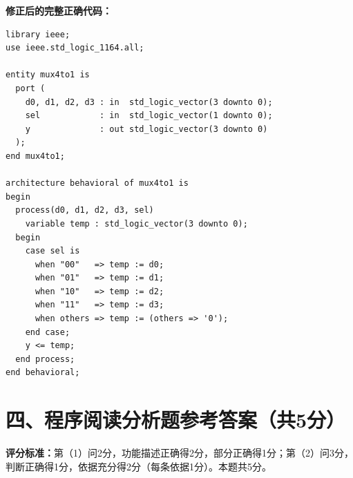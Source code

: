 \noindent\textbf{修正后的完整正确代码：}
\begin{lstlisting}[caption={修正后的4选1多路选择器}, label={lst:ans04_correct}]
library ieee;
use ieee.std_logic_1164.all;

entity mux4to1 is
  port (
    d0, d1, d2, d3 : in  std_logic_vector(3 downto 0);
    sel            : in  std_logic_vector(1 downto 0);
    y              : out std_logic_vector(3 downto 0)
  );
end mux4to1;

architecture behavioral of mux4to1 is
begin
  process(d0, d1, d2, d3, sel)
    variable temp : std_logic_vector(3 downto 0);
  begin
    case sel is
      when "00"   => temp := d0;
      when "01"   => temp := d1;
      when "10"   => temp := d2;
      when "11"   => temp := d3;
      when others => temp := (others => '0');
    end case;
    y <= temp;
  end process;
end behavioral;
\end{lstlisting}

\section*{四、程序阅读分析题参考答案（共5分）}

\begin{framed}
\textbf{评分标准：}第（1）问2分，功能描述正确得2分，部分正确得1分；第（2）问3分，判断正确得1分，依据充分得2分（每条依据1分）。本题共5分。
\end{framed}

